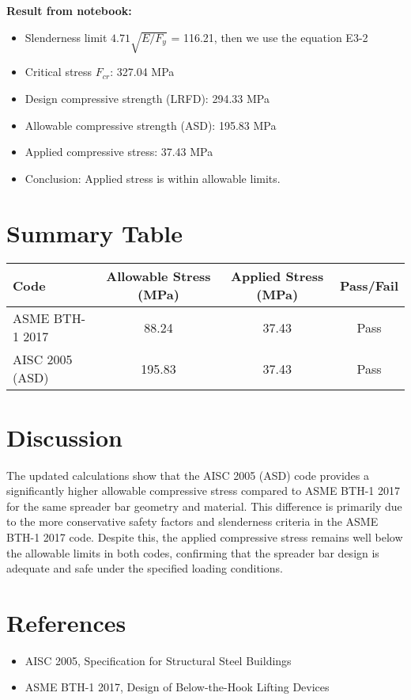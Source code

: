 \documentclass[12pt]{article}
\begin{document}
\noindent \textbf{Result from notebook:}
\begin{itemize}
    \item Slenderness limit $4.71\sqrt{E/F_{y}}$ = 116.21, then we use the equation E3-2 
    \item Critical stress $F_{cr}$: 327.04 MPa
    \item Design compressive strength (LRFD): 294.33 MPa
    \item Allowable compressive strength (ASD): 195.83 MPa
    \item Applied compressive stress: 37.43 MPa
    \item Conclusion: Applied stress is within allowable limits.
\end{itemize}

\section{Summary Table}
\begin{center}
\begin{tabular}{@{}lccc@{}}
\toprule
Code & Allowable Stress (MPa) & Applied Stress (MPa) & Pass/Fail \\
\midrule
ASME BTH-1 2017 & 88.24 & 37.43 & Pass \\
AISC 2005 (ASD) & 195.83 & 37.43 & Pass \\
\bottomrule
\end{tabular}
\end{center}

\section{Discussion}
The updated calculations show that the AISC 2005 (ASD) code provides a significantly higher allowable compressive stress compared to ASME BTH-1 2017 for the same spreader bar geometry and material. This difference is primarily due to the more conservative safety factors and slenderness criteria in the ASME BTH-1 2017 code. Despite this, the applied compressive stress remains well below the allowable limits in both codes, confirming that the spreader bar design is adequate and safe under the specified loading conditions.

\section{References}
\begin{itemize}
    \item AISC 2005, Specification for Structural Steel Buildings
    \item ASME BTH-1 2017, Design of Below-the-Hook Lifting Devices
\end{itemize}
\end{document}
